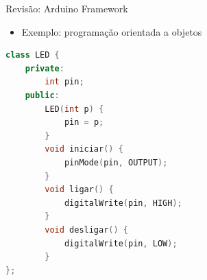 \begin{frame}[fragile]{Revisão: Arduino Framework}
    \begin{itemize}
        \item Exemplo: programação orientada a objetos
    \end{itemize}

\begin{lstlisting}[language=C++,basicstyle=\ttfamily\scriptsize]
class LED {
    private:
        int pin;
    public:
        LED(int p) {
            pin = p;
        }
        void iniciar() {
            pinMode(pin, OUTPUT);
        }
        void ligar() {
            digitalWrite(pin, HIGH);
        }
        void desligar() {
            digitalWrite(pin, LOW);
        }
};
\end{lstlisting}
\end{frame}
